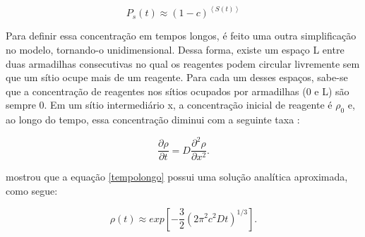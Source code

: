 \begin{equation}
P_s(t) \approx (1-c)^{\left<S(t)\right>}
\end{equation}

Para definir essa concentração em tempos longos, é feito uma outra simplificação
no modelo, tornando-o unidimensional. Dessa forma, existe um espaço L entre duas
armadilhas consecutivas no qual os reagentes podem circular livremente sem que
um sítio ocupe mais de um reagente. Para cada um desses espaços, sabe-se que a
concentração de reagentes nos sítios ocupados por armadilhas (0 e L) são sempre
0. Em um sítio intermediário x, a concentração inicial de reagente é $\rho_0$ e,
ao longo do tempo, essa concentração diminui com a seguinte taxa \cite{3}:

\begin{equation}
\frac{\partial \rho}{\partial t} = D\frac{\partial^2 \rho}{\partial x^2}.
\label{tempolongo}
\end{equation}

\cite{3} mostrou que a equação \ref{tempolongo} possui uma solução analítica
aproximada, como segue:

\begin{equation}
\rho(t) \approx exp\left[ -\frac{3}{2} (2\pi^2c^2Dt)^{1/3} \right].
\label{decaimento}
\end{equation}
